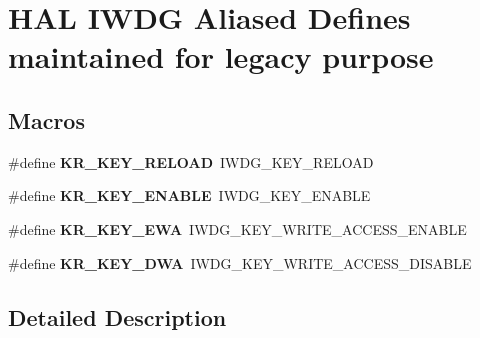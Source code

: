 \hypertarget{group___h_a_l___i_w_d_g___aliased___defines}{}\section{H\+AL I\+W\+DG Aliased Defines maintained for legacy purpose}
\label{group___h_a_l___i_w_d_g___aliased___defines}
\subsection*{Macros}
\begin{DoxyCompactItemize}
\item 
\mbox{\label{group___h_a_l___i_w_d_g___aliased___defines_ga830a9a1bad16c7043c86545f4c159a50}} 
\#define {\bfseries K\+R\+\_\+\+K\+E\+Y\+\_\+\+R\+E\+L\+O\+AD}~I\+W\+D\+G\+\_\+\+K\+E\+Y\+\_\+\+R\+E\+L\+O\+AD
\item 
\mbox{\label{group___h_a_l___i_w_d_g___aliased___defines_gaeaa0dd2da3f9d0cce0d708cfff1df545}} 
\#define {\bfseries K\+R\+\_\+\+K\+E\+Y\+\_\+\+E\+N\+A\+B\+LE}~I\+W\+D\+G\+\_\+\+K\+E\+Y\+\_\+\+E\+N\+A\+B\+LE
\item 
\mbox{\label{group___h_a_l___i_w_d_g___aliased___defines_gadf1ad39b6aa3d426f6e7fbf29d088aa5}} 
\#define {\bfseries K\+R\+\_\+\+K\+E\+Y\+\_\+\+E\+WA}~I\+W\+D\+G\+\_\+\+K\+E\+Y\+\_\+\+W\+R\+I\+T\+E\+\_\+\+A\+C\+C\+E\+S\+S\+\_\+\+E\+N\+A\+B\+LE
\item 
\mbox{\label{group___h_a_l___i_w_d_g___aliased___defines_gae9cf62ac0d5eda2dd2417c280237e446}} 
\#define {\bfseries K\+R\+\_\+\+K\+E\+Y\+\_\+\+D\+WA}~I\+W\+D\+G\+\_\+\+K\+E\+Y\+\_\+\+W\+R\+I\+T\+E\+\_\+\+A\+C\+C\+E\+S\+S\+\_\+\+D\+I\+S\+A\+B\+LE
\end{DoxyCompactItemize}


\subsection{Detailed Description}
